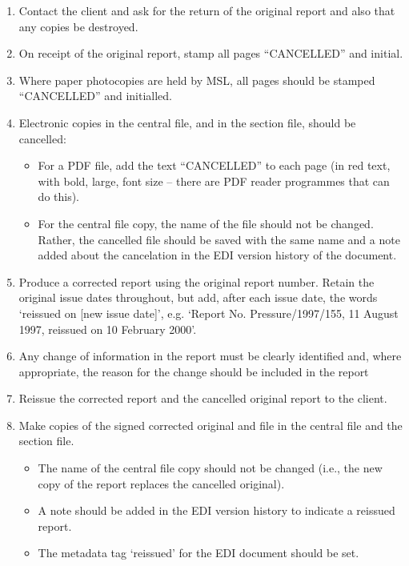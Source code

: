 \begin{enumerate}
\item Contact the client and ask for the return of the original report and also that any copies be destroyed. 

\item On receipt of the original report, stamp all pages ``{\color{red}CANCELLED}” and initial. 

\item Where paper photocopies are held by MSL, all pages should be stamped ``{\color{red}CANCELLED}” and initialled.

\item Electronic copies in the central file, and in the section file, should be cancelled:
\begin{itemize}
\item For a PDF file, add the text “{\color{red}CANCELLED}” to each page (in red text, with bold, large, font size – there are PDF reader programmes that can do this). 
\item For the central file copy, the name of the file should not be changed. Rather, the cancelled file should be saved with the same name and a note added about the cancelation in the EDI version history of the document. 
\end{itemize}

\item Produce a corrected report using the original report number.  Retain the original issue dates throughout, but add, after each issue date, the words ‘reissued on [new issue date]’, e.g. ‘Report No. Pressure/1997/155, 11 August 1997, reissued on 10 February 2000’.

\item Any change of information in the report must be clearly identified and, where appropriate, the reason for the change should be included in the report 

\item Reissue the corrected report and the cancelled original report to the client.

\item Make copies of the signed corrected original and file in the central file and the section file. 
\begin{itemize}
\item The name of the central file copy should not be changed (i.e., the new copy of the report replaces the cancelled original). 
\item A note should be added in the EDI version history to indicate a reissued report.
\item The metadata tag ‘reissued’ for the EDI document should be set.
\end{itemize}

\end{enumerate}

